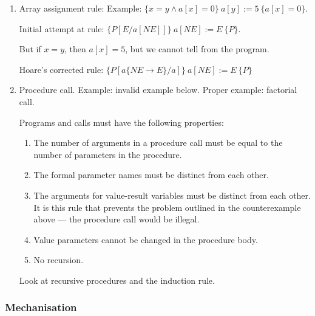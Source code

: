 \documentclass[11pt]{article}
\begin{document}
\begin{enumerate}
\begin{enumerate}
 \end{enumerate}

 \item Array assignment rule: Example: $ \{ x = y \land a[x] = 0\}  ~a[y] := 5~ \{ a[x] = 0\}$.

   Initial attempt at rule: $\{P[E/a[NE]]\}~a[NE] := E~ \{P\}$.

   But if $x=y$, then $a[x] = 5$, but we cannot tell from the program.

   Hoare's corrected rule: $\{P[a\{NE \rightarrow E\}/a]\}~a[NE] := E~ \{P\} $

  \item Procedure call. Example: invalid example below. Proper example: factorial call.

   Programs and calls must have the following properties:

  \begin{enumerate}

    \item The number of arguments in a procedure call must be equal to the number of parameters in the procedure.
      
    \item The formal parameter names must be distinct from each other.

    \item The arguments for value-result variables must be distinct from each other. It is this rule that prevents the problem outlined in the counterexample above --- the procedure call would be illegal.

    \item Value parameters cannot be changed in the procedure body.

    \item No recursion.
   
  \end{enumerate}

  Look at recursive procedures and the induction rule.

\end{enumerate}

\subsubsection*{Mechanisation}
\end{document}
